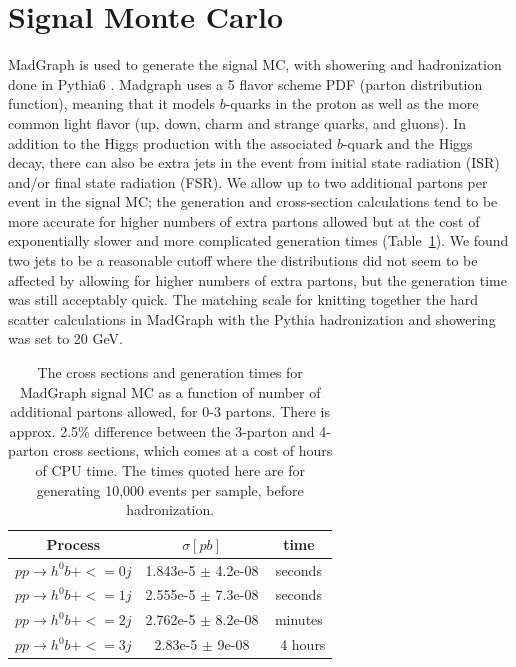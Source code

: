 \section{Signal Monte Carlo}
MadGraph \cite{MadGraph} is used to generate the signal MC, with showering and 
hadronization done in Pythia6 \cite{Pythia6}.  Madgraph uses a 5 flavor scheme PDF 
(parton distribution function), meaning that it models $b$-quarks in the proton as 
well as the more common light flavor (up, down, charm and strange quarks, 
and gluons).  In addition to the Higgs production with the associated $b$-quark and 
the Higgs decay, there can also be extra jets in the event from initial state radiation (ISR) 
and/or final state radiation (FSR).  We allow up to two additional partons per 
event in the signal MC; the generation and cross-section calculations tend to be more 
accurate for higher numbers of extra partons allowed but at the cost of exponentially slower and more 
complicated generation times (Table~\ref{tab:mg_times}).  We found two jets to be a reasonable cutoff where the distributions did 
not seem to be affected by allowing for higher numbers of extra partons, but the generation 
time was still acceptably quick.  The matching scale for knitting together the hard scatter
calculations in MadGraph with the Pythia hadronization and showering was set to 20 GeV.

\begin{table}
   \caption{The cross sections and generation times for MadGraph signal MC as a function
   of number of additional partons allowed, for 0-3 partons.  There is approx. 2.5\%
   difference between the 3-parton and 4-parton cross sections, which comes at a cost
   of hours of CPU time.  The times quoted here are for generating 10,000 events per 
   sample, before hadronization. \label{tab:mg_times}} 
    \center
    \begin{tabular}{ c c c } \hline\hline
    Process & $\sigma [pb]$ & time \\ \hline
    $pp\rightarrow h^0b + <=0j$ & 1.843e-5 $\pm$ 4.2e-08 & seconds \\
    $pp\rightarrow h^0b + <=1j$ & 2.555e-5 $\pm$ 7.3e-08 & seconds \\
    $pp\rightarrow h^0b + <=2j$ & 2.762e-5 $\pm$ 8.2e-08 & minutes \\
    $pp\rightarrow h^0b + <=3j$ & 2.83e-5 $\pm$ 9e-08 & $~$ 4 hours \\  \hline
    \end{tabular}
\end{table}

